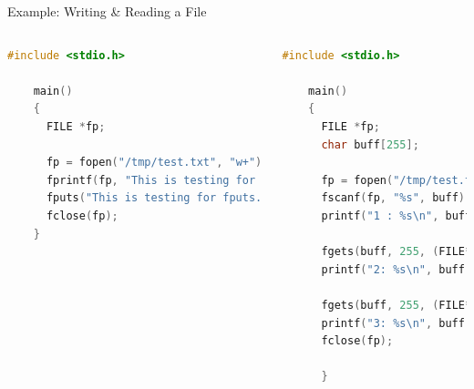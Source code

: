 \documentclass[10pt,t]{beamer}
\begin{document}
\begin{frame}[fragile]{Example: Writing \& Reading a File}
  \begin{columns}
    \begin{lstlisting}[language=C,basicstyle=\fontsize{5}{6}\selectfont\ttfamily]
    #include <stdio.h>

    main()
    {
      FILE *fp;

      fp = fopen("/tmp/test.txt", "w+");
      fprintf(fp, "This is testing for fprintf...\n");
      fputs("This is testing for fputs...\n", fp);
      fclose(fp);
    }
    \end{lstlisting}
    \begin{lstlisting}[language=C,basicstyle=\fontsize{5}{6}\selectfont\ttfamily]
    #include <stdio.h>

    main()
    {
      FILE *fp;
      char buff[255];

      fp = fopen("/tmp/test.txt", "r");
      fscanf(fp, "%s", buff);
      printf("1 : %s\n", buff );

      fgets(buff, 255, (FILE*)fp);
      printf("2: %s\n", buff );

      fgets(buff, 255, (FILE*)fp);
      printf("3: %s\n", buff );
      fclose(fp);

      }
    \end{lstlisting}
  \end{columns}
\end{frame}
\end{document}
